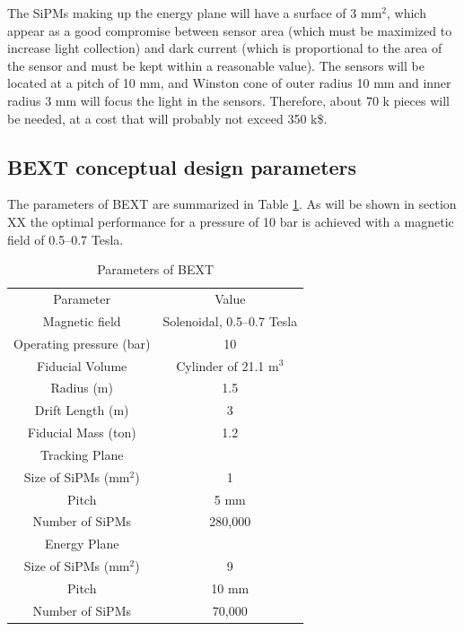 The SiPMs making up the energy plane will have a surface of 3 mm$^2$, which appear as a good compromise between sensor area (which must be maximized to increase light collection) and dark current (which is proportional to the area of the sensor and must be kept within a reasonable value). The sensors will be located at a pitch of 10 mm, and Winston cone of outer radius 10 mm and inner radius 3 mm will focus the light in the sensors. Therefore, about 70 k pieces will be needed, at a cost that will probably not exceed 350 k\$. 

\subsection{BEXT conceptual design parameters}
The parameters of BEXT are summarized in Table \ref{tab.BEXT}. As will be shown in section XX the optimal performance for a pressure of 10 bar is achieved with a magnetic field of 0.5--0.7 Tesla. 
\begin{table}[htdp]
\caption{Parameters of BEXT}
\begin{center}
\begin{tabular}{|c|c|}
Parameter & Value \\
Magnetic field & Solenoidal, 0.5--0.7 Tesla \\
Operating pressure (bar) & 10 \\
Fiducial Volume & Cylinder of 21.1 m$^3$\\
Radius (m) & 1.5 \\
Drift Length (m) & 3 \\
Fiducial Mass (ton) & 1.2 \\
Tracking Plane & \\
Size of SiPMs (mm$^2$) & 1 \\
Pitch & 5 mm \\
Number of SiPMs & 280,000 \\
Energy Plane & \\
Size of SiPMs (mm$^2$) & 9 \\
Pitch & 10 mm \\
Number of SiPMs & 70,000 \\
\end{tabular}
\end{center}
\label{tab.BEXT}
\end{table}%
  



